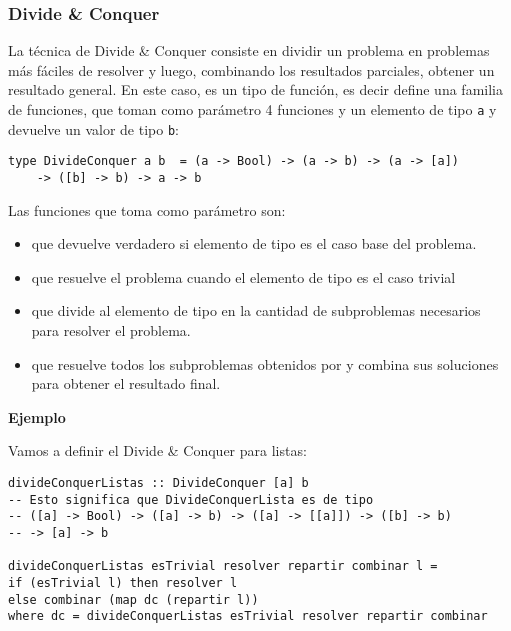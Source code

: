 \subsubsection{Divide \& Conquer}
La técnica de Divide \& Conquer consiste en dividir un problema en problemas más fáciles de resolver y luego, combinando los resultados parciales, obtener un resultado general. En este caso,  es un tipo de función, es decir define una familia de funciones, que toman como parámetro 4 funciones y un elemento de tipo \texttt{a} y devuelve un valor de tipo \texttt{b}:
\begin{centrado}
	\begin{verbatim}
type DivideConquer a b  = (a -> Bool) -> (a -> b) -> (a -> [a]) 
    -> ([b] -> b) -> a -> b                         
	\end{verbatim}
\end{centrado}
Las funciones que toma como parámetro son:
\begin{itemize}
	\item {} que devuelve verdadero si elemento de tipo  es el caso base del problema.
	\item {} que resuelve el problema cuando el elemento de tipo  es el caso trivial
	\item {} que divide al elemento de tipo  en la cantidad de subproblemas necesarios para resolver el problema.
	\item {} que resuelve todos los subproblemas obtenidos por  y combina sus soluciones para obtener el resultado final.
\end{itemize}

\textbf{Ejemplo}

Vamos a definir el Divide \& Conquer para listas:
\begin{centrado}
	\begin{verbatim}
divideConquerListas :: DivideConquer [a] b
-- Esto significa que DivideConquerLista es de tipo 
-- ([a] -> Bool) -> ([a] -> b) -> ([a] -> [[a]]) -> ([b] -> b)
-- -> [a] -> b
		
divideConquerListas esTrivial resolver repartir combinar l =
if (esTrivial l) then resolver l
else combinar (map dc (repartir l))
where dc = divideConquerListas esTrivial resolver repartir combinar	
	\end{verbatim}
\end{centrado}


